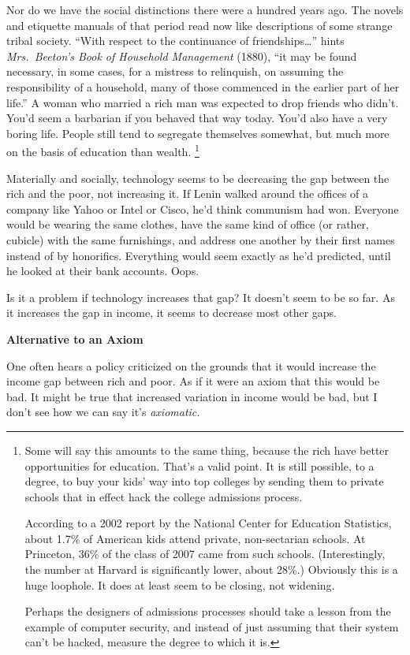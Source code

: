 \documentclass[12pt]{book}
\begin{document}
Nor do we have the social distinctions there were a hundred years ago.
The novels and etiquette manuals of that period read now like
descriptions of some strange tribal society. ``With respect to the
continuance of friendships\ldots{}'' hints \emph{Mrs.~Beeton's Book of
Household Management} (1880), ``it may be found necessary, in some
cases, for a mistress to relinquish, on assuming the responsibility of a
household, many of those commenced in the earlier part of her life.'' A
woman who married a rich man was expected to drop friends who didn't.
You'd seem a barbarian if you behaved that way today. You'd also have a
very boring life. People still tend to segregate themselves somewhat,
but much more on the basis of education than wealth.
\footnote{Some will say this amounts to the same thing, because the rich
have better opportunities for education. That's a valid point. It is
still possible, to a degree, to buy your kids' way into top colleges by
sending them to private schools that in effect hack the college
admissions process.

According to a 2002 report by the National Center for Education
Statistics, about 1.7\% of American kids attend private, non-sectarian
schools. At Princeton, 36\% of the class of 2007 came from such schools.
(Interestingly, the number at Harvard is significantly lower, about
28\%.) Obviously this is a huge loophole. It does at least seem to be
closing, not widening.

Perhaps the designers of admissions processes should take a lesson from
the example of computer security, and instead of just assuming that
their system can't be hacked, measure the degree to which it is.}

Materially and socially, technology seems to be decreasing the gap
between the rich and the poor, not increasing it. If Lenin walked around
the offices of a company like Yahoo or Intel or Cisco, he'd think
communism had won. Everyone would be wearing the same clothes, have the
same kind of office (or rather, cubicle) with the same furnishings, and
address one another by their first names instead of by honorifics.
Everything would seem exactly as he'd predicted, until he looked at
their bank accounts. Oops.

Is it a problem if technology increases that gap? It doesn't seem to be
so far. As it increases the gap in income, it seems to decrease most
other gaps.

\textbf{Alternative to an Axiom}

One often hears a policy criticized on the grounds that it would
increase the income gap between rich and poor. As if it were an axiom
that this would be bad. It might be true that increased variation in
income would be bad, but I don't see how we can say it's
\emph{axiomatic.}
\end{document}
